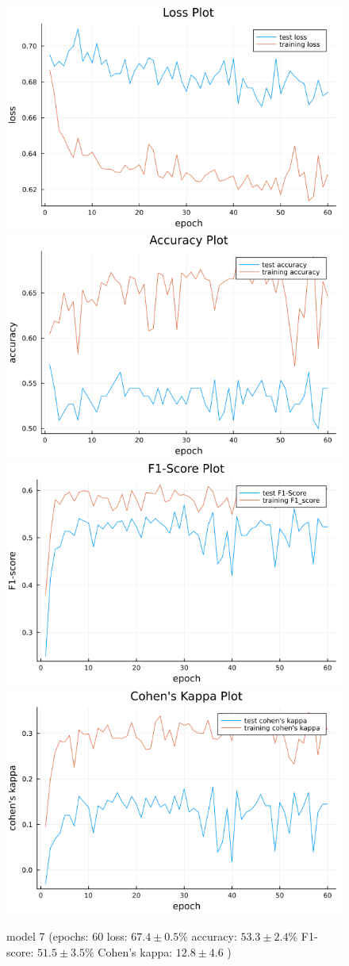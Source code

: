 \documentclass[
a4paper, 
12pt,
grayscalebody, %
abstract=on,
twoside, BCOR10mm, 12pt, DIV13,headinclude, footexclude, final, abstracton, openright
]{ibireprt}
\numberwithin{equation}{chapter}
\numberwithin{table}{chapter}
\numberwithin{figure}{chapter}
\numberwithin{algorithm}{chapter}
\numberwithin{example}{chapter}
\numberwithin{example}{chapter}
\begin{document}
\begin{figure}[h]
	\includegraphics[width=0.4\linewidth]{loss_png_final_2_3.png}\hfill
	\includegraphics[width=0.4\linewidth]{accuracy_png_final_2_3.png}
	\\[\smallskipamount]
	\includegraphics[width=0.4\linewidth]{f1_score_png_final_2_3.png}\hfill
	\includegraphics[width=0.4\linewidth]{cohens_kappa_png_final_2_3.png}
	\caption{model 7 (epochs: 60 loss: $67.4\pm0.5\% $ accuracy: $53.3\pm2.4\%$ F1-score: $51.5\pm3.5\%$  Cohen's kappa: $12.8\pm4.6$ )}
	\label{fig:model_7_60}
\end{figure}
\end{document}
